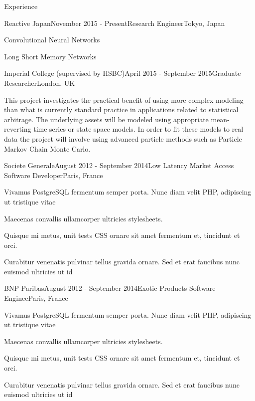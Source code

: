 \documentclass{resume} %
\begin{document}
\begin{rSection}{Experience}

\begin{rSubsection}{Reactive Japan}{November 2015 - Present}{Research Engineer}{Tokyo, Japan}
\item Convolutional Neural Networks
\item Long Short Memory Networks
\end{rSubsection}


\begin{rSubsection}{Imperial College (supervised by HSBC)}{April 2015 - September 2015}{Graduate Researcher}{London, UK}
\item This project investigates the practical benefit of using more complex modeling than what is currently standard practice in applications related to statistical arbitrage. The underlying assets will be modeled using appropriate mean-reverting time series or state space models. In order to fit these models to real data the project will involve using advanced particle methods such as Particle Markov Chain Monte Carlo.
\end{rSubsection}


\begin{rSubsection}{Societe Generale}{August 2012 - September 2014}{Low Latency Market Access Software Developer}{Paris, France}
\item Vivamus PostgreSQL fermentum semper porta. Nunc diam velit PHP, adipiscing ut tristique vitae
\item Maecenas convallis ullamcorper ultricies stylesheets.
\item Quisque mi metus, unit tests CSS ornare sit amet fermentum et, tincidunt et orci.
\item Curabitur venenatis pulvinar tellus gravida ornare. Sed et erat faucibus nunc euismod ultricies ut id
\end{rSubsection}

\begin{rSubsection}{BNP Paribas}{August 2012 - September 2014}{Exotic Products Software Enginee}{Paris, France}
\item Vivamus PostgreSQL fermentum semper porta. Nunc diam velit PHP, adipiscing ut tristique vitae
\item Maecenas convallis ullamcorper ultricies stylesheets.
\item Quisque mi metus, unit tests CSS ornare sit amet fermentum et, tincidunt et orci.
\item Curabitur venenatis pulvinar tellus gravida ornare. Sed et erat faucibus nunc euismod ultricies ut id
\end{rSubsection}


\end{rSection}
\end{document}
